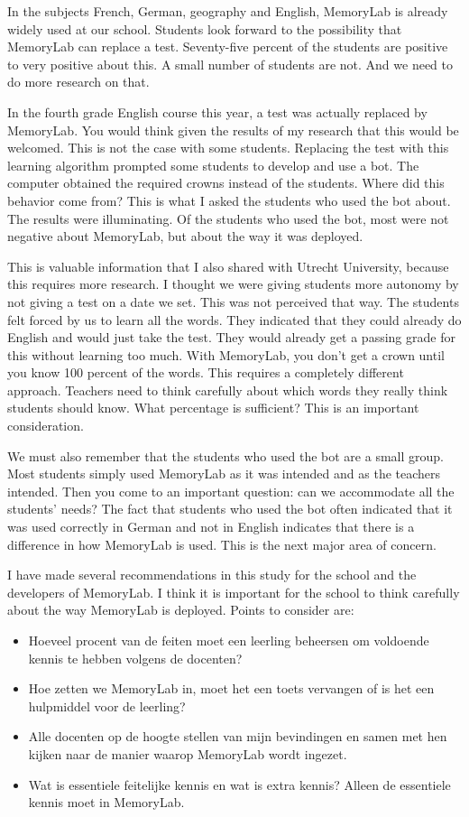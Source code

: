 \documentclass[12pt, a4paper]{article}
\begin{document}
{{In the subjects French, German, geography and English, MemoryLab is already widely used at our school. Students look forward to the possibility that MemoryLab can replace a test. Seventy-five percent of the students are positive to very positive about this. A small number of students are not. And we need to do more research on that.

In the fourth grade English course this year, a test was actually replaced by MemoryLab. You would think given the results of my research that this would be welcomed. This is not the case with some students. Replacing the test with this learning algorithm prompted some students to develop and use a bot. The computer obtained the required crowns instead of the students. Where did this behavior come from? This is what I asked the students who used the bot about. The results were illuminating. Of the students who used the bot, most were not negative about MemoryLab, but about the way it was deployed.

This is valuable information that I also shared with Utrecht University, because this requires more research. I thought we were giving students more autonomy by not giving a test on a date we set. This was not perceived that way. The students felt forced by us to learn all the words. They indicated that they could already do English and would just take the test. They would already get a passing grade for this without learning too much. With MemoryLab, you don't get a crown until you know 100 percent of the words. This requires a completely different approach. Teachers need to think carefully about which words they really think students should know. What percentage is sufficient? This is an important consideration.

We must also remember that the students who used the bot are a small group. Most students simply used MemoryLab as it was intended and as the teachers intended. Then you come to an important question: can we accommodate all the students' needs? The fact that students who used the bot often indicated that it was used correctly in German and not in English indicates that there is a difference in how MemoryLab is used. This is the next major area of concern.

I have made several recommendations in this study for the school and the developers of MemoryLab. I think it is important for the school to think carefully about the way MemoryLab is deployed. Points to consider are:
\begin{itemize}
    \item Hoeveel procent van de feiten moet een leerling beheersen om voldoende kennis te hebben volgens de docenten?
    \item Hoe zetten we MemoryLab in, moet het een toets vervangen of is het een hulpmiddel voor de leerling?
    \item Alle docenten op de hoogte stellen van mijn bevindingen en samen met hen kijken naar de manier waarop MemoryLab wordt ingezet.
    \item Wat is essentiele feitelijke kennis en wat is extra kennis? Alleen de essentiele kennis moet in MemoryLab.
\end{itemize}

}}
\end{document}
